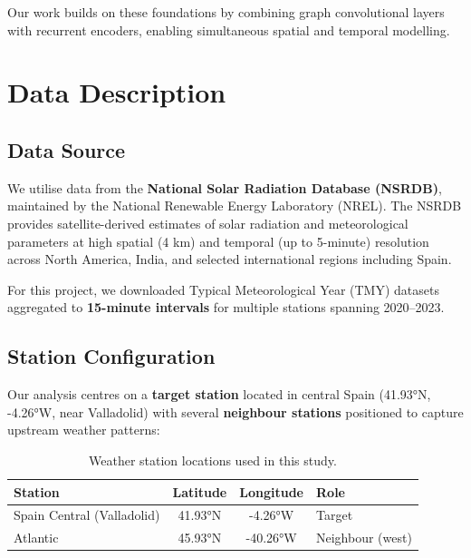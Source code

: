 \documentclass[11pt,a4paper]{article}
\begin{document}
Our work builds on these foundations by combining graph convolutional layers with recurrent encoders, enabling simultaneous spatial and temporal modelling.

\section{Data Description}
\label{sec:data}

\subsection{Data Source}

We utilise data from the \textbf{National Solar Radiation Database (NSRDB)}, maintained by the National Renewable Energy Laboratory (NREL). The NSRDB provides satellite-derived estimates of solar radiation and meteorological parameters at high spatial (4 km) and temporal (up to 5-minute) resolution across North America, India, and selected international regions including Spain.

For this project, we downloaded Typical Meteorological Year (TMY) datasets aggregated to \textbf{15-minute intervals} for multiple stations spanning 2020--2023.

\subsection{Station Configuration}

Our analysis centres on a \textbf{target station} located in central Spain (41.93°N, -4.26°W, near Valladolid) with several \textbf{neighbour stations} positioned to capture upstream weather patterns:

\begin{table}[H]
\centering
\caption{Weather station locations used in this study.}
\label{tab:stations}
\begin{tabular}{lccl}
\toprule
\textbf{Station} & \textbf{Latitude} & \textbf{Longitude} & \textbf{Role} \\
\midrule
Spain Central (Valladolid) & 41.93°N & -4.26°W & Target \\
Atlantic & 45.93°N & -40.26°W & Neighbour (west) \\
\bottomrule
\end{tabular}
\end{table}
\end{document}
